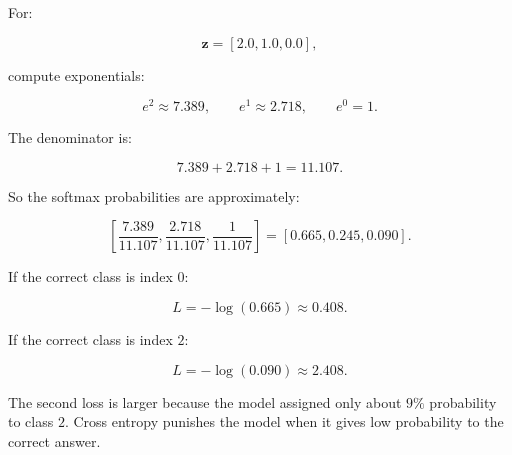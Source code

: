 For:

\[
\mathbf{z}=[2.0,1.0,0.0],
\]

compute exponentials:

\[
e^2\approx7.389,\qquad e^1\approx2.718,\qquad e^0=1.
\]

The denominator is:

\[
7.389+2.718+1=11.107.
\]

So the softmax probabilities are approximately:

\[
\left[
\frac{7.389}{11.107},
\frac{2.718}{11.107},
\frac{1}{11.107}
\right]
=
[0.665,0.245,0.090].
\]

If the correct class is index \(0\):

\[
L=-\log(0.665)\approx0.408.
\]

If the correct class is index \(2\):

\[
L=-\log(0.090)\approx2.408.
\]

The second loss is larger because the model assigned only about \(9\%\) probability to class \(2\). Cross entropy punishes the model when it gives low probability to the correct answer.
